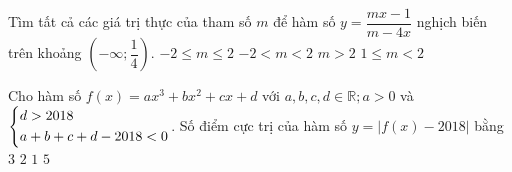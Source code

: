 \begin{ex}%
Tìm tất cả các giá trị thực của tham số $ m $ để hàm số $ y=\dfrac{mx-1}{m-4x} $ nghịch biến trên khoảng $ \left(-\infty;\dfrac{1}{4}\right) $.	
	\choice
	{$ -2\leq m \leq 2 $}
	{$ -2<m<2 $}
	{$ m>2 $}
	{\True $ 1\leq m <2 $}
\end{ex}
\begin{ex}%
Cho hàm số $ f(x)=ax^3+bx^2+cx+d $ với $ a, b, c, d \in \mathbb{R}; a>0 $ và $ \left\{\begin{aligned}&d > 2018 \\ &a+b+c+d-2018 < 0\end{aligned}\right. $. Số điểm cực trị của hàm số $ y=|f(x)-2018| $ bằng	
	\choice
	{$ 3 $}
	{$ 2 $}
	{$ 1 $}
	{\True $ 5 $}
\end{ex}
